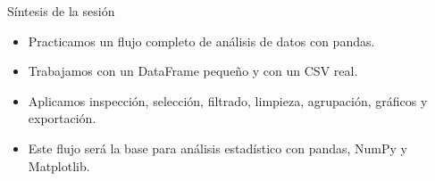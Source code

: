 \documentclass[10pt]{beamer}
\begin{document}
\begin{frame}{Síntesis de la sesión}
  \begin{itemize}
    \item Practicamos un flujo completo de análisis de datos con pandas.
    \item Trabajamos con un DataFrame pequeño y con un CSV real.
    \item Aplicamos inspección, selección, filtrado, limpieza, agrupación, gráficos y exportación.
    \item Este flujo será la base para análisis estadístico con pandas, NumPy y Matplotlib.
  \end{itemize}
\end{frame}
\end{document}
